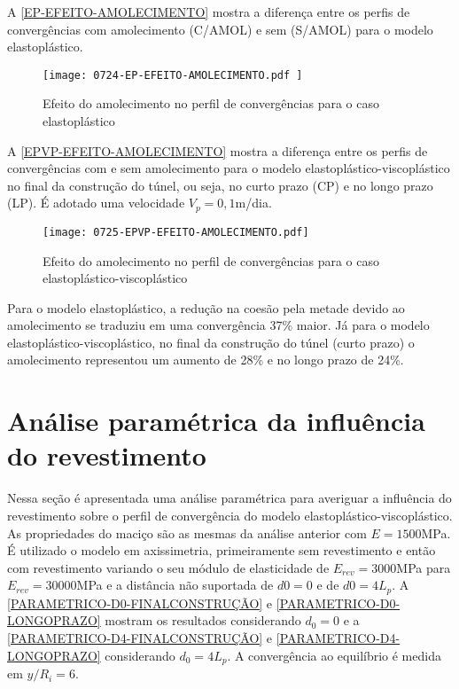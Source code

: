 A \autoref{EP-EFEITO-AMOLECIMENTO} mostra a diferença entre os perfis de convergências com amolecimento (C/AMOL) e sem (S/AMOL) para o modelo elastoplástico.

\begin{figure}[H]
	\begin{center}
		\texttt{[image: 0724-EP-EFEITO-AMOLECIMENTO.pdf
		]}
	\end{center}
	\caption{\label{EP-EFEITO-AMOLECIMENTO}Efeito do amolecimento no perfil de convergências para o caso elastoplástico}
\end{figure}

A \autoref{EPVP-EFEITO-AMOLECIMENTO} mostra a diferença entre os perfis de convergências com e sem amolecimento para o modelo elastoplástico-viscoplástico no final da construção do túnel, ou seja, no curto prazo (CP) e no longo prazo (LP). É adotado uma velocidade $V_p=0,1$m/dia.

\begin{figure}[H]
	\begin{center}
		\texttt{[image: 0725-EPVP-EFEITO-AMOLECIMENTO.pdf]}
	\end{center}
	\caption{\label{EPVP-EFEITO-AMOLECIMENTO}Efeito do amolecimento no perfil de convergências para o caso elastoplástico-viscoplástico}
\end{figure}

Para o modelo elastoplástico, a redução na coesão pela metade devido ao amolecimento se traduziu em uma convergência 37\% maior. Já para o modelo elastoplástico-viscoplástico, no final da construção do túnel (curto prazo) o amolecimento representou um aumento de 28\% e no longo prazo de 24\%.


\section{Análise paramétrica da influência do revestimento}

Nessa seção é apresentada uma análise paramétrica para averiguar a influência do revestimento sobre o perfil de convergência do modelo elastoplástico-viscoplástico. As propriedades do maciço são as mesmas da análise anterior com $E=1500$MPa. É utilizado o modelo em axissimetria, primeiramente sem revestimento e então com revestimento variando o seu módulo de elasticidade de $E_{rev} = 3000$MPa para $E_{rev} = 30000$MPa e a distância não suportada de $d0 = 0$ e de $d0 = 4L_p$. A \autoref{PARAMETRICO-D0-FINALCONSTRUÇÃO} e \autoref{PARAMETRICO-D0-LONGOPRAZO} mostram os resultados considerando $d_0 = 0$ e a \autoref{PARAMETRICO-D4-FINALCONSTRUÇÃO} e \autoref{PARAMETRICO-D4-LONGOPRAZO} considerando $d_0=4L_p$. A convergência ao equilíbrio é medida em $y/R_i = 6$. 

